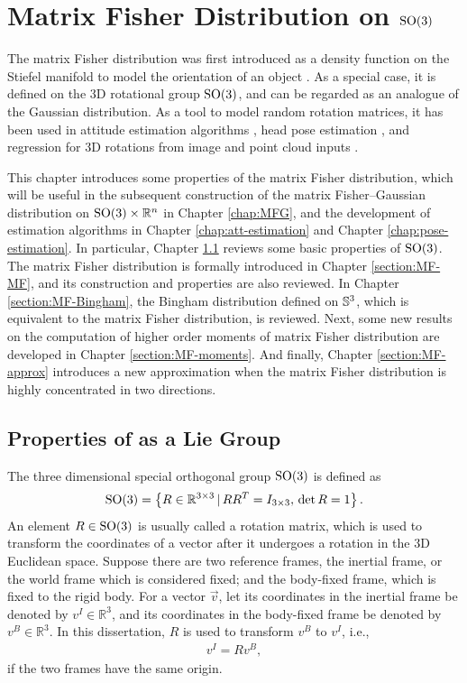
\chapter{Matrix Fisher Distribution on $\mathrm{SO}(3)$} \label{chap:MF}

The matrix Fisher distribution was first introduced as a density function on the Stiefel manifold to model the orientation of an object \cite{downs1972orientation}.
As a special case, it is defined on the 3D rotational group $\mathrm{SO}(3)$, and can be regarded as an analogue of the Gaussian distribution.
As a tool to model random rotation matrices, it has been used in attitude estimation algorithms \cite{lee2018bayesian}, head pose estimation \cite{liu2021mfdnet}, and regression for 3D rotations from image and point cloud inputs \cite{mohlin2020probabilistic,yin2022fishermatch}.

This chapter introduces some properties of the matrix Fisher distribution, which will be useful in the subsequent construction of the matrix Fisher--Gaussian distribution on $\mathrm{SO}(3)\times \mathbb{R}^n$ in Chapter \ref{chap:MFG}, and the development of estimation algorithms in Chapter \ref{chap:att-estimation} and Chapter \ref{chap:pose-estimation}.
In particular, Chapter \ref{section:MF-SO(3)} reviews some basic properties of $\mathrm{SO}(3)$.
The matrix Fisher distribution is formally introduced in Chapter \ref{section:MF-MF}, and its construction and properties are also reviewed.
In Chapter \ref{section:MF-Bingham}, the Bingham distribution defined on $\mathbb{S}^3$, which is equivalent to the matrix Fisher distribution, is reviewed.
Next, some new results on the computation of higher order moments of matrix Fisher distribution are developed in Chapter \ref{section:MF-moments}.
And finally, Chapter \ref{section:MF-approx} introduces a new approximation when the matrix Fisher distribution is highly concentrated in two directions.

\section{Properties of  as a Lie Group} \label{section:MF-SO(3)}

The three dimensional special orthogonal group $\mathrm{SO}(3)$ is defined as
\begin{align}
	\mathrm{SO}(3) = \left\{ R\in\mathbb{R}^{3\times 3} \,|\, RR^T = I_{3\times 3},\, \det R = 1 \right\}.
\end{align}
An element $R\in\mathrm{SO}(3)$ is usually called a rotation matrix, which is used to transform the coordinates of a vector after it undergoes a rotation in the 3D Euclidean space.
Suppose there are two reference frames, the inertial frame, or the world frame which is considered fixed; and the body-fixed frame, which is fixed to the rigid body.
For a vector $\vec{v}$, let its coordinates in the inertial frame be denoted by $v^I \in \mathbb{R}^3$, and its coordinates in the body-fixed frame be denoted by $v^B \in \mathbb{R}^3$.
In this dissertation, $R$ is used to transform $v^B$ to $v^I$, i.e.,
\begin{align}
	v^I = Rv^B,
\end{align}
if the two frames have the same origin.

